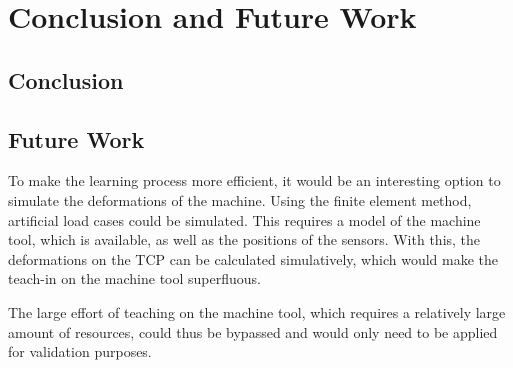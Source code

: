 \chapter{Conclusion and Future Work}

\section{Conclusion}


\section{Future Work}

To make the learning process more efficient, it would be an interesting option to simulate the deformations of the machine. Using the finite element method, artificial load cases could be simulated. This requires a model of the machine tool, which is available, as well as the positions of the sensors. With this, the deformations on the TCP can be calculated simulatively, which would make the teach-in on the machine tool superfluous.

The large effort of teaching on the machine tool, which requires a relatively large amount of resources, could thus be bypassed and would only need to be applied for validation purposes.




